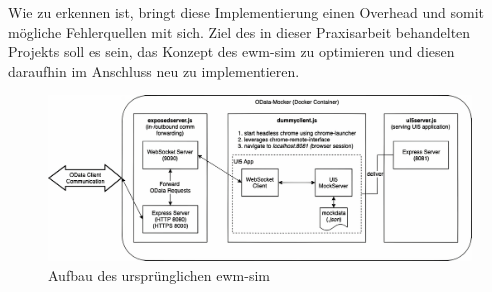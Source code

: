 Wie zu erkennen ist, bringt diese Implementierung einen Overhead und somit mögliche Fehlerquellen mit sich. Ziel des in dieser Praxisarbeit behandelten Projekts soll es sein, das Konzept des \ac{ewm-sim} zu optimieren und diesen daraufhin im Anschluss neu zu implementieren.

\begin{figure}
    \centering
    \includegraphics[width=\textwidth]{Bilder/ewm-sim_v1_4x.pdf}
    \caption{Aufbau des ursprünglichen \ac{ewm-sim}}
    \label{fig:ewm-sim-v1}
\end{figure}

